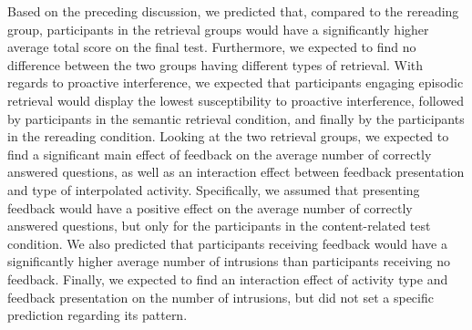 \documentclass[../main.tex]{subfiles}
\begin{document}
Based on the preceding discussion, we predicted that, compared to the rereading 
group, participants in the retrieval groups would have a significantly higher 
average total score on the final test. Furthermore, we expected to find no 
difference between the two groups having different types of retrieval. With 
regards to proactive interference, we expected that participants engaging 
episodic retrieval would display the lowest susceptibility to proactive 
interference, followed by participants in the semantic retrieval condition, and 
finally by the participants in the rereading condition. Looking at the two 
retrieval groups, we expected to find a significant main effect of feedback on 
the average number of correctly answered questions, as well as an interaction 
effect between feedback presentation and type of interpolated activity. 
Specifically, we assumed that presenting feedback would have a positive effect 
on the average number of correctly answered questions, but only for the 
participants in the content-related test condition. We also predicted that 
participants receiving feedback would have a significantly higher average 
number of intrusions than participants receiving no feedback. Finally, we 
expected to find an interaction effect of activity type and feedback 
presentation on the number of intrusions, but did not set a specific prediction 
regarding its pattern.
 
{
	\biblio
}
\end{document}
